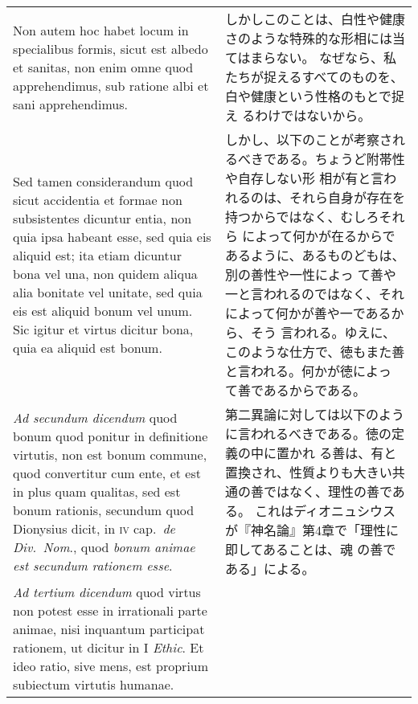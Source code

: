 \documentclass[10pt]{jsarticle}
\begin{document}
\begin{longtable}{p{21em}p{21em}}
\\

Non autem hoc habet locum in specialibus formis, sicut est albedo et
sanitas, non enim omne quod apprehendimus, sub ratione albi et sani
apprehendimus. 

&

しかしこのことは、白性や健康さのような特殊的な形相には当てはまらない。
なぜなら、私たちが捉えるすべてのものを、白や健康という性格のもとで捉え
るわけではないから。


\\

Sed tamen considerandum quod sicut accidentia et formae
non subsistentes dicuntur entia, non quia ipsa habeant esse, sed quia
eis aliquid est; ita etiam dicuntur bona vel una, non quidem aliqua
alia bonitate vel unitate, sed quia eis est aliquid bonum vel
unum. Sic igitur et virtus dicitur bona, quia ea aliquid est bonum.

&

しかし、以下のことが考察されるべきである。ちょうど附帯性や自存しない形
相が有と言われるのは、それら自身が存在を持つからではなく、むしろそれら
によって何かが在るからであるように、あるものどもは、別の善性や一性によっ
て善や一と言われるのではなく、それによって何かが善や一であるから、そう
言われる。ゆえに、このような仕方で、徳もまた善と言われる。何かが徳によっ
て善であるからである。


\\


{\itshape Ad secundum dicendum} quod bonum quod ponitur in definitione
virtutis, non est bonum commune, quod convertitur cum ente, et est in
plus quam qualitas, sed est bonum rationis, secundum quod Dionysius
dicit, in {\scshape iv} cap.~{\itshape de Div.~Nom}., quod {\itshape
bonum animae est secundum rationem esse}.

&

第二異論に対しては以下のように言われるべきである。徳の定義の中に置かれ
る善は、有と置換され、性質よりも大きい共通の善ではなく、理性の善である。
これはディオニュシウスが『神名論』第4章で「理性に即してあることは、魂
の善である」による。

\\



{\itshape Ad tertium dicendum} quod virtus non potest esse in
irrationali parte animae, nisi inquantum participat rationem, ut
dicitur in I {\itshape Ethic}. Et ideo ratio, sive mens, est proprium
subiectum virtutis humanae.

&


\end{longtable}
\end{document}
